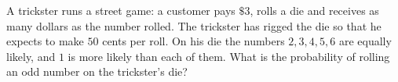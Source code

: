 A trickster runs a street game: a customer pays $\$3$, rolls a die and receives as many dollars as the number rolled. The trickster has rigged the die so that he expects to make $50$ cents per roll. On his die the numbers $2,3,4,5,6$ are equally likely, and $1$ is more likely than each of them. What is the probability of rolling an odd number on the trickster's die?
